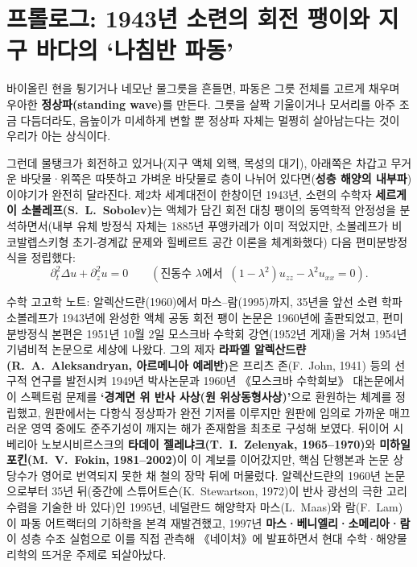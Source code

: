 \documentclass[11pt,a4paper]{article}
\begin{document}
\section{프롤로그: 1943년 소련의 회전 팽이와 지구 바다의 `나침반 파동'}

바이올린 현을 튕기거나 네모난 물그릇을 흔들면, 파동은 그릇 전체를 고르게 채우며 우아한 \textbf{정상파(standing wave)}를 만든다. 그릇을 살짝 기울이거나 모서리를 아주 조금 다듬더라도, 음높이가 미세하게 변할 뿐 정상파 자체는 멀쩡히 살아남는다는 것이 우리가 아는 상식이다.

그런데 물탱크가 회전하고 있거나(지구 액체 외핵, 목성의 대기), 아래쪽은 차갑고 무거운 바닷물·위쪽은 따뜻하고 가벼운 바닷물로 층이 나뉘어 있다면(\textbf{성층 해양의 내부파}) 이야기가 완전히 달라진다. 제2차 세계대전이 한창이던 1943년, 소련의 수학자 \textbf{세르게이 소볼레프(S.~L.~Sobolev)}는 액체가 담긴 회전 대칭 팽이의 동역학적 안정성을 분석하면서(내부 유체 방정식 자체는 1885년 푸앵카레가 이미 적었지만, 소볼레프가 비코발렙스키형 초기-경계값 문제와 힐베르트 공간 이론을 체계화했다) 다음 편미분방정식을 정립했다:
\begin{equation}\label{eq:kr-sobolev}
  \partial_t^2 \Delta u + \partial_z^2 u = 0 \qquad (\text{진동수 } \lambda\text{에서}\;\; (1-\lambda^2)u_{zz} - \lambda^2 u_{xx} = 0).
\end{equation}

\begin{storybox}{수학 고고학 노트: 알렉산드랸(1960)에서 마스--람(1995)까지, 35년을 앞선 소련 학파}
소볼레프가 1943년에 완성한 액체 공동 회전 팽이 논문은 1960년에 출판되었고, 편미분방정식 본편은 1951년 10월 2일 모스크바 수학회 강연(1952년 게재)을 거쳐 1954년 기념비적 논문으로 세상에 나왔다. 그의 제자 \textbf{라파엘 알렉산드랸(R.~A.~Aleksandryan, 아르메니아 예레반)}은 프리츠 존(F.~John, 1941) 등의 선구적 연구를 발전시켜 1949년 박사논문과 1960년 《모스크바 수학회보》 대논문에서 이 스펙트럼 문제를 \textbf{`경계면 위 반사 사상(원 위상동형사상)'}으로 환원하는 체계를 정립했고, 원판에서는 다항식 정상파가 완전 기저를 이루지만 원판에 임의로 가까운 매끄러운 영역 중에도 준주기성이 깨지는 해가 존재함을 최초로 구성해 보였다. 뒤이어 시베리아 노보시비르스크의 \textbf{타데이 젤레냐크(T.~I.~Zelenyak, 1965--1970)}와 \textbf{미하일 포킨(M.~V.~Fokin, 1981--2002)}이 이 계보를 이어갔지만, 핵심 단행본과 논문 상당수가 영어로 번역되지 못한 채 철의 장막 뒤에 머물렀다. 알렉산드랸의 1960년 논문으로부터 35년 뒤(중간에 스튜어트슨(K.~Stewartson, 1972)이 반사 광선의 극한 고리 수렴을 기술한 바 있다)인 1995년, 네덜란드 해양학자 마스(L.~Maas)와 람(F.~Lam)이 파동 어트랙터의 기하학을 본격 재발견했고, 1997년 \textbf{마스·베니엘리·소메리아·람}이 성층 수조 실험으로 이를 직접 관측해 《네이처》에 발표하면서 현대 수학·해양물리학의 뜨거운 주제로 되살아났다.
\end{storybox}
\end{document}
